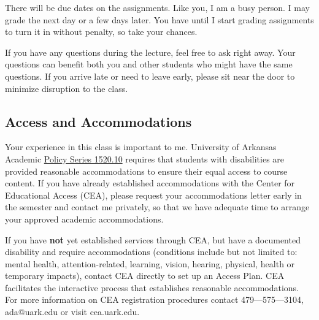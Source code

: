 \documentclass[12pt]{article}
\begin{document}
There will be due dates on the assignments. Like you, I am a busy person. I may grade the next day or a few days later. You have until I start grading assignments to turn it in without penalty, so take your chances. 

If you have any questions during the lecture, feel free to ask right away. Your questions can benefit both you and other students who might have the same questions. If you arrive late or need to leave early, please sit near the door to minimize disruption to the class.

\subsection*{Access and Accommodations}

Your experience in this class is important to me. University of Arkansas Academic \href{https://policies.uark.edu/academic/152010.php}{Policy Series 1520.10} requires that students with disabilities are provided reasonable accommodations to ensure their equal access to course content. If you have already established accommodations with the Center for Educational Access (CEA), please request your accommodations letter early in the semester and contact me privately, so that we have adequate time to arrange your approved academic accommodations.

If you have \textbf{not} yet established services through CEA, but have a documented disability and require accommodations (conditions include but not limited to: mental health, attention-related, learning, vision, hearing, physical, health  or temporary impacts), contact CEA directly to set up an Access Plan. CEA facilitates the interactive process that establishes reasonable accommodations.  For more information on CEA registration procedures contact 479—575—3104, ada@uark.edu or visit cea.uark.edu.

\end{document}
